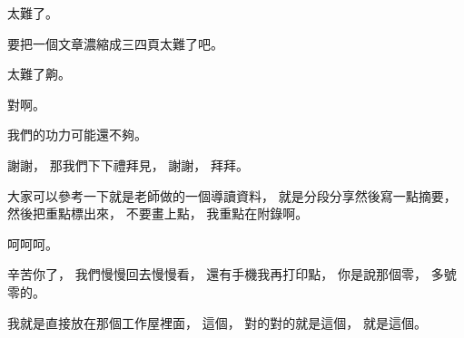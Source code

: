 \hypertarget{w06:cue:3368}{}太難了。

\hypertarget{w06:cue:3369}{}要把一個文章濃縮成三四頁太難了吧。

\hypertarget{w06:cue:3370}{}太難了齁。

\hypertarget{w06:cue:3371}{}對啊。

\hypertarget{w06:cue:3372}{}我們的功力可能還不夠。

\hypertarget{w06:cue:3373}{}謝謝，
\hypertarget{w06:cue:3374}{}那我們下下禮拜見，
\hypertarget{w06:cue:3375}{}謝謝，
\hypertarget{w06:cue:3376}{}拜拜。

\hypertarget{w06:cue:3377}{}大家可以參考一下就是老師做的一個導讀資料，
\hypertarget{w06:cue:3378}{}就是分段分享然後寫一點摘要，
\hypertarget{w06:cue:3379}{}然後把重點標出來，
\hypertarget{w06:cue:3380}{}不要畫上點，
\hypertarget{w06:cue:3381}{}我重點在附錄啊。

\hypertarget{w06:cue:3382}{}呵呵呵。

\hypertarget{w06:cue:3383}{}辛苦你了，
\hypertarget{w06:cue:3384}{}我們慢慢回去慢慢看，
\hypertarget{w06:cue:3385}{}還有手機我再打印點，
\hypertarget{w06:cue:3386}{}你是說那個零，
\hypertarget{w06:cue:3387}{}多號零的。

\hypertarget{w06:cue:3388}{}我就是直接放在那個工作屋裡面，
\hypertarget{w06:cue:3389}{}這個，
\hypertarget{w06:cue:3390}{}對的對的就是這個，
\hypertarget{w06:cue:3391}{}就是這個。
